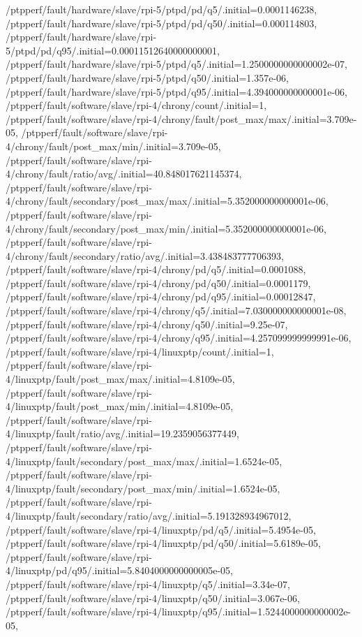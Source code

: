 {    /ptpperf/fault/hardware/slave/rpi-5/ptpd/pd/q5/.initial=0.0001146238,
    /ptpperf/fault/hardware/slave/rpi-5/ptpd/pd/q50/.initial=0.000114803,
    /ptpperf/fault/hardware/slave/rpi-5/ptpd/pd/q95/.initial=0.00011512640000000001,
    /ptpperf/fault/hardware/slave/rpi-5/ptpd/q5/.initial=1.2500000000000002e-07,
    /ptpperf/fault/hardware/slave/rpi-5/ptpd/q50/.initial=1.357e-06,
    /ptpperf/fault/hardware/slave/rpi-5/ptpd/q95/.initial=4.394000000000001e-06,
    /ptpperf/fault/software/slave/rpi-4/chrony/count/.initial=1,
    /ptpperf/fault/software/slave/rpi-4/chrony/fault/post_max/max/.initial=3.709e-05,
    /ptpperf/fault/software/slave/rpi-4/chrony/fault/post_max/min/.initial=3.709e-05,
    /ptpperf/fault/software/slave/rpi-4/chrony/fault/ratio/avg/.initial=40.848017621145374,
    /ptpperf/fault/software/slave/rpi-4/chrony/fault/secondary/post_max/max/.initial=5.352000000000001e-06,
    /ptpperf/fault/software/slave/rpi-4/chrony/fault/secondary/post_max/min/.initial=5.352000000000001e-06,
    /ptpperf/fault/software/slave/rpi-4/chrony/fault/secondary/ratio/avg/.initial=3.438483777706393,
    /ptpperf/fault/software/slave/rpi-4/chrony/pd/q5/.initial=0.0001088,
    /ptpperf/fault/software/slave/rpi-4/chrony/pd/q50/.initial=0.0001179,
    /ptpperf/fault/software/slave/rpi-4/chrony/pd/q95/.initial=0.00012847,
    /ptpperf/fault/software/slave/rpi-4/chrony/q5/.initial=7.030000000000001e-08,
    /ptpperf/fault/software/slave/rpi-4/chrony/q50/.initial=9.25e-07,
    /ptpperf/fault/software/slave/rpi-4/chrony/q95/.initial=4.257099999999991e-06,
    /ptpperf/fault/software/slave/rpi-4/linuxptp/count/.initial=1,
    /ptpperf/fault/software/slave/rpi-4/linuxptp/fault/post_max/max/.initial=4.8109e-05,
    /ptpperf/fault/software/slave/rpi-4/linuxptp/fault/post_max/min/.initial=4.8109e-05,
    /ptpperf/fault/software/slave/rpi-4/linuxptp/fault/ratio/avg/.initial=19.2359056377449,
    /ptpperf/fault/software/slave/rpi-4/linuxptp/fault/secondary/post_max/max/.initial=1.6524e-05,
    /ptpperf/fault/software/slave/rpi-4/linuxptp/fault/secondary/post_max/min/.initial=1.6524e-05,
    /ptpperf/fault/software/slave/rpi-4/linuxptp/fault/secondary/ratio/avg/.initial=5.191328934967012,
    /ptpperf/fault/software/slave/rpi-4/linuxptp/pd/q5/.initial=5.4954e-05,
    /ptpperf/fault/software/slave/rpi-4/linuxptp/pd/q50/.initial=5.6189e-05,
    /ptpperf/fault/software/slave/rpi-4/linuxptp/pd/q95/.initial=5.8404000000000005e-05,
    /ptpperf/fault/software/slave/rpi-4/linuxptp/q5/.initial=3.34e-07,
    /ptpperf/fault/software/slave/rpi-4/linuxptp/q50/.initial=3.067e-06,
    /ptpperf/fault/software/slave/rpi-4/linuxptp/q95/.initial=1.5244000000000002e-05,
}
